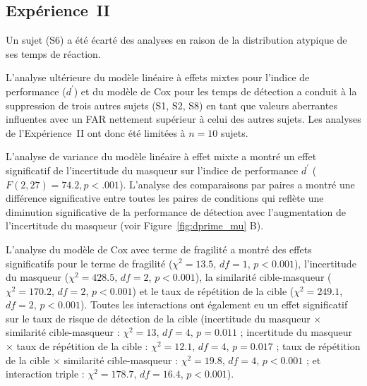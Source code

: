\subsection{Expérience~II}
\label{chapitre4resultatsexpII}

Un sujet (S6) a été écarté des analyses en raison de la distribution atypique de ses temps de réaction. 

L'analyse ultérieure du modèle linéaire à effets mixtes pour l'indice de performance ($d^\prime$) et du modèle de Cox pour les temps de détection a conduit à la suppression de trois autres sujets (S1, S2, S8) en tant que valeurs aberrantes influentes avec un FAR nettement supérieur à celui des autres sujets. 
Les analyses de l'Expérience~II ont donc été limitées à $n=10$ sujets.

L'analyse de variance du modèle linéaire à effet mixte a montré un effet significatif de l'incertitude du masqueur sur l'indice de performance $d^\prime$ (${F(2,27)=74.2}, {p<.001}$). 
L'analyse des comparaisons par paires a montré une différence significative entre toutes les paires de conditions qui reflète une diminution significative de la performance de détection avec l'augmentation de l'incertitude du masqueur (voir Figure~\ref{fig:dprime_mu} B).

L'analyse du modèle de Cox avec terme de fragilité a montré des effets significatifs pour le terme de fragilité (${\chi^2=13.5}$, ${df=1}$, ${p<0.001}$), l'incertitude du masqueur (${\chi^2=428.5}$, ${df=2}$, ${p<0.001}$), la similarité cible-masqueur (${\chi^2=170.2}$, ${df=2}$, ${p<0.001}$) et le taux de répétition de la cible (${\chi^2=249.1}$, ${df=2}$, ${p<0.001}$). 
Toutes les interactions ont également eu un effet significatif sur le taux de risque de détection de la cible (incertitude du masqueur $\times$ similarité cible-masqueur : ${\chi^2=13}$, ${df=4}$, ${p=0.011}$ ; incertitude du masqueur $\times$ taux de répétition de la cible : ${\chi^2=12.1}$, ${df=4}$, ${p=0.017}$ ; taux de répétition de la cible $\times$ similarité cible-masqueur : ${\chi^2=19.8}$, ${df=4}$, ${p<0.001}$ ; et interaction triple : ${\chi^2=178.7}$, $df=16.4$, ${p<0.001}$). 

